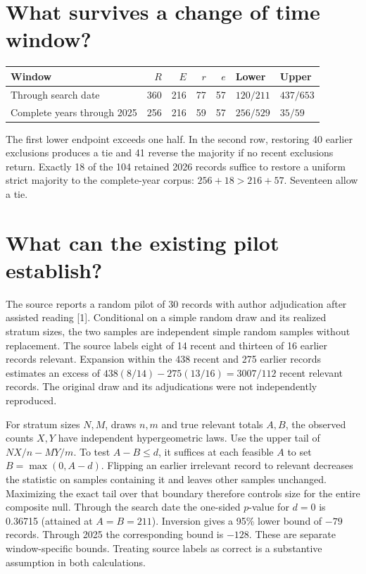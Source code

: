 \documentclass[11pt]{article}
\begin{document}
\section{What survives a change of time window?}
\begin{center}
\begin{tabular}{lrrrrll}
\toprule
Window & $R$ & $E$ & $r$ & $e$ & Lower & Upper\\
\midrule
Through search date &360&216&77&57&$120/211$&$437/653$\\
Complete years through 2025 &256&216&59&57&$256/529$&$35/59$\\
\bottomrule
\end{tabular}
\end{center}
The first lower endpoint exceeds one half. In the second row, restoring 40 earlier exclusions produces a tie and 41 reverse the majority if no recent exclusions return. Exactly 18 of the 104 retained 2026 records suffice to restore a uniform strict majority to the complete-year corpus: $256+18>216+57$. Seventeen allow a tie.

\section{What can the existing pilot establish?}
The source reports a random pilot of 30 records with author adjudication after assisted reading [1]. Conditional on a simple random draw and its realized stratum sizes, the two samples are independent simple random samples without replacement. The source labels eight of 14 recent and thirteen of 16 earlier records relevant. Expansion within the 438 recent and 275 earlier records estimates an excess of $438(8/14)-275(13/16)=3007/112$ recent relevant records. The original draw and its adjudications were not independently reproduced.

For stratum sizes $N,M$, draws $n,m$ and true relevant totals $A,B$, the observed counts $X,Y$ have independent hypergeometric laws. Use the upper tail of $NX/n-MY/m$. To test $A-B\le d$, it suffices at each feasible $A$ to set $B=\max(0,A-d)$. Flipping an earlier irrelevant record to relevant decreases the statistic on samples containing it and leaves other samples unchanged. Maximizing the exact tail over that boundary therefore controls size for the entire composite null. Through the search date the one-sided $p$-value for $d=0$ is 0.36715 (attained at $A=B=211$). Inversion gives a 95\% lower bound of $-79$ records. Through 2025 the corresponding bound is $-128$. These are separate window-specific bounds. Treating source labels as correct is a substantive assumption in both calculations.
\newpage
\end{document}
